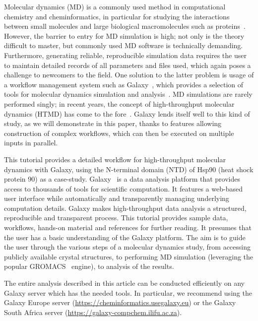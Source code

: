 \documentclass[twocolumn]{bmcart}%
\begin{document}
Molecular dynamics (MD) is a commonly used method in computational chemistry and cheminformatics, in particular for studying the interactions between small molecules and large biological macromolecules such as proteins~\cite{berendsen01}. However, the barrier to entry for MD simulation is high; not only is the theory difficult to master, but commonly used MD software is technically demanding. Furthermore, generating reliable, reproducible simulation data requires the user to maintain detailed records of all parameters and files used, which again poses a challenge to newcomers to the field. One solution to the latter problem is usage of a workflow management system such as Galaxy~\cite{afgan_galaxy_2018}, which provides a selection of tools for molecular dynamics simulation and analysis~\cite{senapathi_biomolecular_2019}. MD simulations are rarely performed singly; in recent years, the concept of high-throughput molecular dynamics (HTMD) has come to the fore~\cite{HARVEY20121059,Guterres2020}. Galaxy lends itself well to this kind of study, as we will demonstrate in this paper, thanks to features allowing construction of complex workflows, which can then be executed on multiple inputs in parallel.

This tutorial provides a detailed workflow for high-throughput molecular dynamics with Galaxy, using the N-terminal domain (NTD) of Hsp90 (heat shock protein 90) as a case-study. Galaxy~\cite{afgan_galaxy_2018} is a data analysis platform that provides access to thousands of tools for scientific computation. It features a web-based user interface while automatically and transparently managing underlying computation details. Galaxy makes high-throughput data analysis a structured, reproducible and transparent process. This tutorial provides sample data, workflows, hands-on material and references for further reading. It presumes that the user has a basic understanding of the Galaxy platform. The aim is to guide the user through the various steps of a molecular dynamics study, from accessing publicly available crystal structures, to performing MD simulation (leveraging the popular GROMACS~\cite{abraham_gromacs_2015,Lemkul2019} engine), to analysis of the results.

The entire analysis described in this article can be conducted efficiently on any Galaxy server which has the needed tools. In particular, we recommend using the Galaxy Europe server
(\url{https://cheminformatics.usegalaxy.eu}) or the Galaxy South Africa server (\url{https://galaxy-compchem.ilifu.ac.za}).
\end{document}
